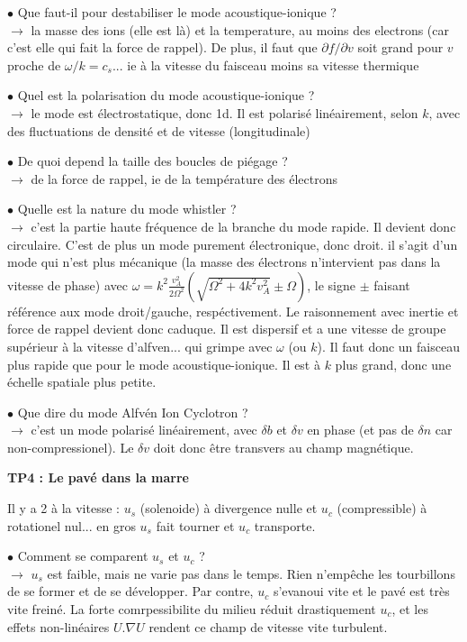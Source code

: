\documentclass[10pt]{letter}
\begin{document}
$\bullet$ Que faut-il pour destabiliser le mode acoustique-ionique ? \\
$\rightarrow$ la masse des ions (elle est là) et la temperature, au moins des electrons (car c'est elle qui fait la force de rappel). De plus, il faut que $\partial f/ \partial v$ soit grand pour $v$ proche de $\omega/k = c_s$... ie à la vitesse du faisceau moins sa vitesse thermique

$\bullet$ Quel est la polarisation du mode acoustique-ionique ? \\
$\rightarrow$ le mode est électrostatique, donc 1d. Il est polarisé linéairement, selon $k$, avec des fluctuations de densité et de vitesse (longitudinale)

$\bullet$ De quoi depend la taille des boucles de piégage ? \\
$\rightarrow$ de la force de rappel, ie de la température des électrons

$\bullet$ Quelle est la nature du mode whistler ? \\
$\rightarrow$ c'est la partie haute fréquence de la branche du mode rapide. Il devient donc circulaire. C'est de plus un mode purement électronique, donc droit. il s'agit d'un mode qui n'est plus mécanique (la masse des électrons n'intervient pas dans la vitesse de phase) avec $\omega = k^2 \frac{v_A^2}{2 \Omega^2} (\sqrt{\Omega^2+ 4 k^2 v_A^2} \pm \Omega)$, le signe $\pm$ faisant référence aux mode droit/gauche, respéctivement. Le raisonnement avec inertie et force de rappel devient donc caduque. Il est dispersif et a une vitesse de groupe supérieur à la vitesse d'alfven... qui grimpe avec $\omega$ (ou $k$). Il faut donc un faisceau plus rapide que pour le mode acoustique-ionique. Il est à $k$ plus grand, donc une échelle spatiale plus petite.

$\bullet$ Que dire du mode  Alfvén Ion Cyclotron ? \\
$\rightarrow$ c'est un mode polarisé linéairement, avec $\delta b$ et $\delta v$ en phase (et pas de $\delta n$ car non-compressionel). Le $\delta v$ doit donc être transvers au champ magnétique.

\newpage

{\bf TP4 : Le pavé dans la marre}

Il y a 2 à la vitesse : $u_s$ (solenoide) à divergence nulle et $u_c$ (compressible) à rotationel nul... en gros $u_s$ fait tourner et $u_c$ transporte.

$\bullet$ Comment se comparent $u_s$ et $u_c$ ? \\
$\rightarrow$ $u_s$ est faible, mais ne varie pas dans le temps. Rien n'empêche les tourbillons de se former et de se développer. Par contre, $u_c$ s'evanoui vite et le pavé est très vite freiné. La forte comrpessibilite du milieu réduit drastiquement $u_c$, et les effets non-linéaires $U . \nabla U$ rendent ce champ de vitesse vite turbulent.
\end{document}
